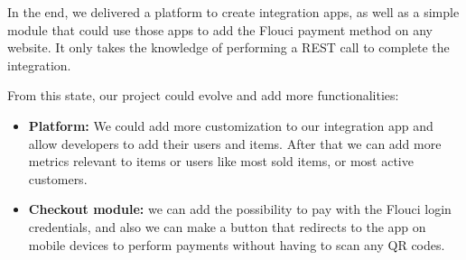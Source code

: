 \begin{spacing}{1.2}
In the end, we delivered a platform to create integration apps, as well as a simple module that could use those apps to add the Flouci payment method on any website. It only takes the knowledge of performing a REST call to complete the integration.

From this state, our project could evolve and add more functionalities:
\begin{itemize}
	\item \textbf{Platform:} We could add more customization to our integration app and allow developers to add their users and items. After that we can add more metrics relevant to items or users like most sold items, or most active customers.
	\item \textbf{Checkout module:} we can add the possibility to pay with the Flouci login credentials, and also we can make a button that redirects to the app on mobile devices to perform payments without having to scan any QR codes.
\end{itemize} 

\end{spacing}